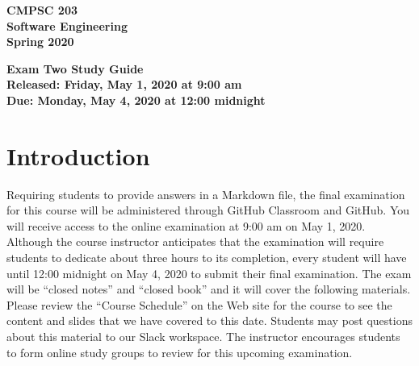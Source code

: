 \documentclass[11pt]{article}
\newcommand{\assignmentduedate}{May 4}
\newcommand{\assignmentassignedate}{May 1}
\newcommand{\assignmentnumber}{Two}
\newcommand{\labyear}{2020}
\newcommand{\assignedday}{Friday}
\newcommand{\dueday}{Monday}
\newcommand{\releasedtime}{9:00 am}
\newcommand{\duetime}{12:00 midnight}
\newcommand{\assigneddate}{Released: \assignedday, \assignmentassignedate, \labyear{} at \releasedtime{}}
\newcommand{\duedate}{Due: \dueday, \assignmentduedate, \labyear{} at \duetime{}}
\newcommand{\guidetitle}[1]
{
  \begin{center}
    \begin{center}
      \bf
      CMPSC 203\\Software Engineering\\
      Spring 2020\\
      \medskip
    \end{center}
    \bf
    #1
  \end{center}
}
\begin{document}
\thispagestyle{empty}

\guidetitle{Exam \assignmentnumber{} Study Guide \\ \assigneddate{} \\ \duedate{}}

\section*{Introduction}

Requiring students to provide answers in a Markdown file, the final examination
for this course will be administered through GitHub Classroom and GitHub. You
will receive access to the online examination at \releasedtime{} on
\assignmentassignedate{}, 2020.
%
Although the course instructor anticipates that the examination will require
students to dedicate about three hours to its completion, every student will
have until \duetime{} on May 4, 2020 to submit their final examination.
%
The exam will be ``closed notes'' and ``closed book'' and it will cover the
following materials. Please review the ``Course Schedule'' on the Web site for
the course to see the content and slides that we have covered to this date.
Students may post questions about this material to our Slack workspace. The
instructor encourages students to form online study groups to review for this
upcoming examination.
\end{document}
